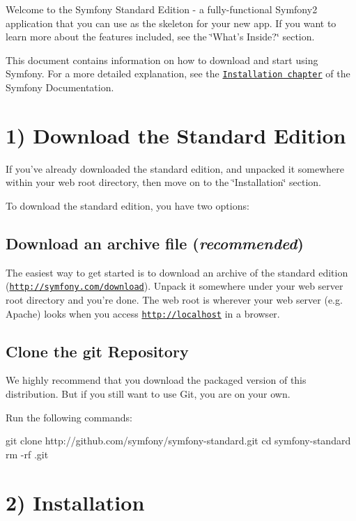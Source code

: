 Welcome to the Symfony Standard Edition -\/ a fully-\/functional Symfony2 application that you can use as the skeleton for your new app. If you want to learn more about the features included, see the \char`\"{}\-What's Inside?\char`\"{} section.

This document contains information on how to download and start using Symfony. For a more detailed explanation, see the \href{http://symfony.com/doc/current/book/installation.html}{\tt Installation chapter} of the Symfony Documentation.

\section*{1) Download the Standard Edition}

If you've already downloaded the standard edition, and unpacked it somewhere within your web root directory, then move on to the \char`\"{}\-Installation\char`\"{} section.

To download the standard edition, you have two options\-:

\subsection*{Download an archive file ({\itshape recommended})}

The easiest way to get started is to download an archive of the standard edition (\href{http://symfony.com/download}{\tt http\-://symfony.\-com/download}). Unpack it somewhere under your web server root directory and you're done. The web root is wherever your web server (e.\-g. Apache) looks when you access {\ttfamily \href{http://localhost}{\tt http\-://localhost}} in a browser.

\subsection*{Clone the git Repository}

We highly recommend that you download the packaged version of this distribution. But if you still want to use Git, you are on your own.

Run the following commands\-: \begin{DoxyVerb}git clone http://github.com/symfony/symfony-standard.git
cd symfony-standard
rm -rf .git
\end{DoxyVerb}


\section*{2) Installation}

